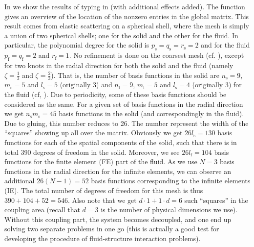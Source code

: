 In  we show the results of typing  in \MATLAB (with additional effects added). The function gives an overview of the location of the nonzero entries in the global matrix. This result comes from elastic scattering on a spherical shell, where the mesh is simply a union of two spherical shells; one for the solid and the other for the fluid. In particular, the polynomial degree for the solid is $p_{\mathrm{s}}=q_{\mathrm{s}}=r_{\mathrm{s}}=2$ and for the fluid $p_{\mathrm{f}}=q_{\mathrm{f}}=2$ and $r_{\mathrm{f}}=1$. No refinement is done on the coarsest mesh (cf. ), except for two knots in the radial direction for both the solid and the fluid (namely $\zeta=\frac{1}{3}$ and $\zeta=\frac{2}{3}$). That is, the number of basis functions in the solid are $n_{\mathrm{s}}=9$, $m_{\mathrm{s}}=5$ and $l_{\mathrm{s}}=5$ (originally 3) and $n_{\mathrm{f}}=9$, $m_{\mathrm{f}}=5$ and $l_{\mathrm{s}}=4$ (originally 3) for the fluid (cf, ). Due to periodicity, some of these basis functions should be considered as the same. For a given set of basis functions in the radial direction we get $n_{\mathrm{s}} m_{\mathrm{s}} = 45$ basis functions in the solid (and correspondingly in the fluid). Due to gluing, this number reduces to 26. The number represent the width of the ``squares'' showing up all over the matrix. Obviously we get $26l_{\mathrm{s}} = 130$ basis functions for each of the spatial components of the solid, such that there is in total 390 degrees of freedom in the solid. Moreover, we see $26l_{\mathrm{f}}=104$ basis functions for the finite element (FE) part of the fluid. As we use $N=3$ basis functions in the radial direction for the infinite elements, we can observe an additional $26(N-1)=52$ basis functions corresponding to the infinite elements (IE). The total number of degrees of freedom for this mesh is thus $390+104+52=546$. Also note that we get $d\cdot 1+1\cdot d = 6$ such ``squares'' in the coupling area (recall that $d=3$ is the number of physical dimensions we use). Without this coupling part, the system becomes decoupled, and one end up solving two separate problems in one go (this is actually a good test for developing the procedure of fluid-structure interaction problems). 

